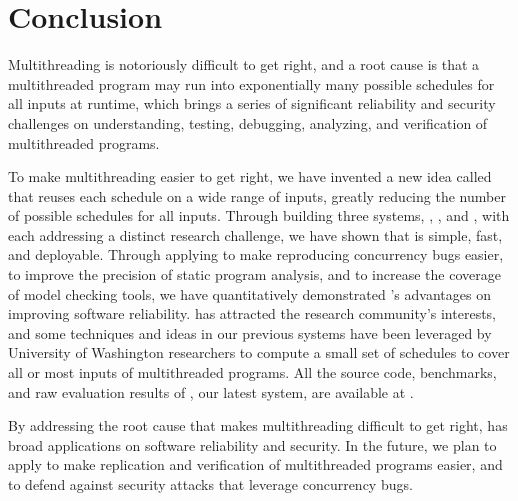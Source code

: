 \chapter{Conclusion} \label{sec:conclusion}

Multithreading is notoriously difficult to get right, and a root cause is that 
a multithreaded program may run into exponentially many
possible schedules for all inputs at runtime, which brings a series of
significant reliability and security challenges on understanding,
testing, debugging, analyzing, and verification of multithreaded
programs.

To make multithreading easier to get right, we have invented a new idea called 
\smt that reuses each schedule on a wide range of inputs,
greatly reducing the number of possible schedules for all inputs. Through
building three \smt systems, \tern, \peregrine, and \parrot, with each 
addressing a distinct research challenge, we have shown that \smt is 
simple, fast, and deployable. Through applying \smt to make reproducing 
concurrency bugs easier, to improve the precision of static program analysis, 
and to increase the coverage of model checking tools, we have quantitatively 
demonstrated \smt's advantages on improving software reliability. \smt has 
attracted the research community's interests, and some techniques and ideas in 
our previous systems have been leveraged by University of Washington 
researchers to compute a small set of schedules to cover all or most inputs of 
multithreaded programs. All the source code, benchmarks, and raw evaluation 
results of \parrot, our latest \smt system, are available at \github.

By addressing the root cause that makes multithreading difficult to get right,
\smt has broad applications on software reliability and security. In the 
future, we plan to apply \smt to make replication and verification of 
multithreaded programs easier, and to defend against security attacks 
that leverage concurrency bugs.